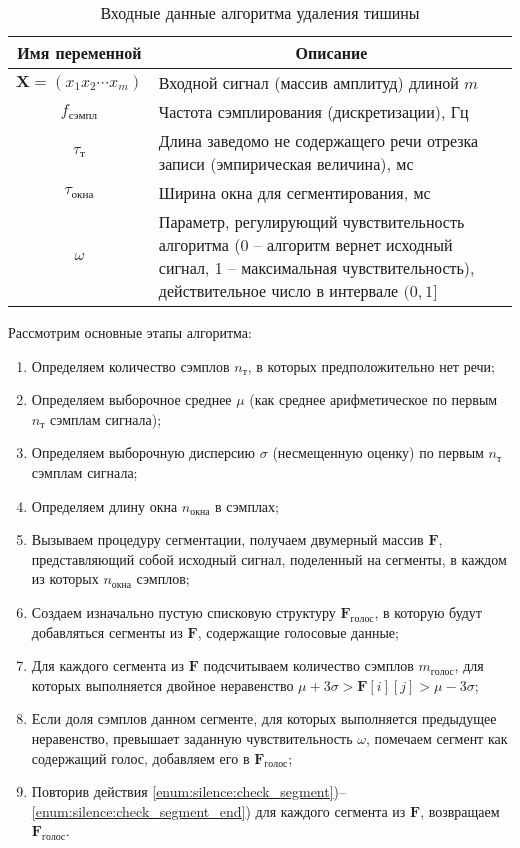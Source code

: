 \begin{table}[h]
    \caption{Входные данные алгоритма удаления тишины}
    \begin{tabular}{|c|p{13cm}|}
    \hline
    \multicolumn{1}{|c|}{\textbf{Имя переменной}} &
    \multicolumn{1}{|c|}{\textbf{Описание}} \\
    \hline
    $\mathbf{X} = (x_1 x_2 \cdots x_m)$ & Входной сигнал (массив амплитуд) длиной $m$ \\
    $f_{сэмпл}$                         & Частота сэмплирования (дискретизации), Гц \\
    $\tau_{т}$                          & Длина заведомо не содержащего речи отрезка записи (эмпирическая величина), мс\\
    $\tau_{окна}$                       & Ширина окна для сегментирования, мс\\
    $\omega$                            & Параметр, регулирующий чувствительность алгоритма (0 -- алгоритм вернет исходный сигнал, 1 -- максимальная чувствительность), действительное число в интервале $(0, 1]$\\
    \hline
    \end{tabular}
    \label{tab:unsilence_args}
\end{table}

Рассмотрим основные этапы алгоритма:

\begin{enumerate}
\item Определяем количество сэмплов $n_т$, в которых предположительно нет речи;
\item Определяем выборочное среднее $\mu$ (как среднее арифметическое по первым $n_т$ сэмплам сигнала);
\item Определяем выборочную дисперсию $\sigma$ (несмещенную оценку) по первым $n_т$ сэмплам сигнала;
\item Определяем длину окна $n_{окна}$ в сэмплах;
\item Вызываем процедуру сегментации, получаем двумерный массив $\mathbf{F}$, представляющий собой исходный сигнал, поделенный на сегменты, в каждом из которых $n_{окна}$ сэмплов;
\item Создаем изначально пустую списковую структуру $\mathbf{F}_{голос}$, в которую будут добавляться сегменты из $\mathbf{F}$, содержащие голосовые данные;
\item \label{enum:silence:check_segment} Для каждого сегмента из $\mathbf{F}$ подсчитываем количество сэмплов $m_{голос}$, для которых выполняется двойное неравенство $\mu\!+\!3\sigma > \mathbf{F}[i][j] > \mu\!-\!3\sigma$;
\item \label{enum:silence:check_segment_end} Если доля сэмплов данном сегменте, для которых выполняется предыдущее неравенство, превышает заданную чувствительность $\omega$, помечаем сегмент как содержащий голос, добавляем его в $\mathbf{F}_{голос}$;
\item Повторив действия \ref{enum:silence:check_segment})--\ref{enum:silence:check_segment_end}) для каждого сегмента из $\textbf{F}$, возвращаем $\mathbf{F}_{голос}$.
\end{enumerate}

